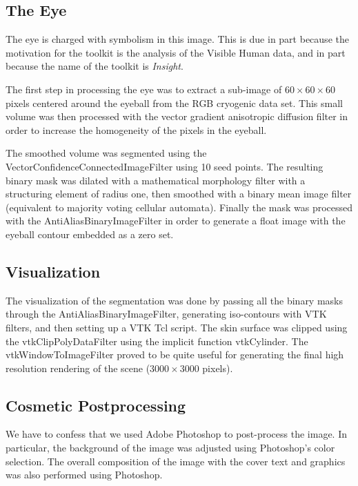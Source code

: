 \subsection*{The Eye} 

The eye is charged with symbolism in this image. This is due in part because
the motivation for the toolkit is the analysis of the Visible Human data,
and in part because the name of the toolkit is \emph{Insight}.

The first step in processing the eye was to extract a sub-image of
$60\times60\times60$ pixels centered around the eyeball from the RGB
cryogenic data set. This small volume was then processed with the vector
gradient anisotropic diffusion filter in order to increase the homogeneity of
the pixels in the eyeball.

The smoothed volume was segmented using the
VectorConfidenceConnectedImageFilter using 10 seed points. The resulting
binary mask was dilated with a mathematical morphology filter with a
structuring element of radius one, then smoothed with a binary mean image
filter (equivalent to majority voting cellular automata). Finally the mask
was processed with the AntiAliasBinaryImageFilter in order to generate a
float image with the eyeball contour embedded as a zero set.

\subsection*{Visualization}

The visualization of the segmentation was done by passing all the binary
masks through the AntiAliasBinaryImageFilter, generating iso-contours with
VTK filters, and then setting up a VTK Tcl script. The skin surface was
clipped using the vtkClipPolyDataFilter using the implicit function
vtkCylinder. The vtkWindowToImageFilter proved to be quite useful for
generating the final high resolution rendering of the scene ($3000\times3000$
pixels).

\subsection*{Cosmetic Postprocessing}

We have to confess that we used Adobe Photoshop to post-process the image. In
particular, the background of the image was adjusted using Photoshop's color
selection. The overall composition of the image with the cover text and
graphics was also performed using Photoshop.

